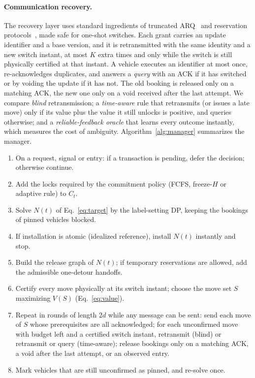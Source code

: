 \documentclass[10pt]{article}
\begin{document}
\paragraph{Communication recovery.} The recovery layer uses standard ingredients of truncated ARQ~\cite{liu2004} and reservation protocols~\cite{dresner2008,au2011}, made safe for one-shot switches. Each grant carries an update identifier and a base version, and it is retransmitted with the same identity and a new switch instant, at most $K$ extra times and only while the switch is still physically certified at that instant. A vehicle executes an identifier at most once, re-acknowledges duplicates, and answers a \emph{query} with an ACK if it has switched or by voiding the update if it has not. The old booking is released only on a matching ACK, the new one only on a void received after the last attempt. We compare \emph{blind} retransmission; a \emph{time-aware} rule that retransmits (or issues a late move) only if its value plus the value it still unlocks is positive, and queries otherwise; and a \emph{reliable-feedback oracle} that learns every outcome instantly, which measures the cost of ambiguity. Algorithm~\ref{alg:manager} summarizes the manager.

\begin{algorithm}[t]\small
\caption{Intersection manager: one decision and its installation transaction}\label{alg:manager}
\begin{enumerate}\setlength{\itemsep}{0pt}\setlength{\parsep}{0pt}
\item On a request, signal or entry: if a transaction is pending, defer the decision; otherwise continue.
\item Add the locks required by the commitment policy (FCFS, freeze-$H$ or adaptive rule) to $C_t$.
\item Solve $N(t)$ of Eq.~\eqref{eq:target} by the label-setting DP, keeping the bookings of pinned vehicles blocked.
\item If installation is atomic (idealized reference), install $N(t)$ instantly and stop.
\item Build the release graph of $N(t)$; if temporary reservations are allowed, add the admissible one-detour handoffs.
\item Certify every move physically at its switch instant; choose the move set $S$ maximizing $V(S)$ (Eq.~\ref{eq:value}).
\item Repeat in rounds of length $2d$ while any message can be sent: send each move of $S$ whose prerequisites are all acknowledged; for each unconfirmed move with budget left and a certified switch instant, retransmit (blind) or retransmit or query (time-aware); release bookings only on a matching ACK, a void after the last attempt, or an observed entry.
\item Mark vehicles that are still unconfirmed as pinned, and re-solve once.
\end{enumerate}
\end{algorithm}
\end{document}
